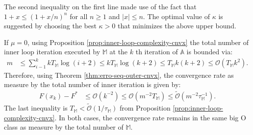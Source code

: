 \documentclass[12pt]{article}
\begin{document}
            The second inequality on the first line made use of the fact that $1 + x \le (1 + x/n)^n$ for all $n \ge 1$ and $|x| \le n$. 
            The optimal value of $\kappa$ is suggested by choosing the best $\kappa > 0$ that minimizes the above upper bound. 
            \par
            If $\mu = 0$, using Proposition \ref{prop:inner-loop-complexity-cnvx} the total number of inner loop iteration executed by $\mathbb M$ at the $k$ th iteration of $\mathbb A$ is bounded via: 
            \begin{align*}
                m &\le \sum_{i - 1}^{k} k T_{\mathbb M} \log(i + 2) \le k T_{\mathbb M} \log(k + 2) 
                \le T_{\mathbb M}k(k + 2) 
                \le 
                \mathcal O(T_{\mathbb M} k^2). 
            \end{align*}
            Therefore, using Theorem \ref{thm:erro-seq-outer-cnvx}, the convergence rate as measure by the total number of inner iteration is given by: 
            \begin{align*}
                F(x_k)- F^* &\le 
                \mathcal O(k^{-2})\le 
                \mathcal O
                    \left(
                        m^{-2}T_{\mathbb M}
                    \right) 
                    \le \widetilde{\mathcal O}
                        \left(m^{-2}\tau_{\mathbb M}^{-1}\right). 
            \end{align*}
            The last inequality is $T_{\mathbb M} < \widetilde{\mathcal O}(1/\tau_{\mathbb M})$ from Proposition \ref{prop:inner-loop-complexity-cnvx}. 
            In both cases, the convergence rate remains in the same big O class as measure by the total number of $\mathbb M$. 
            
\end{document}
